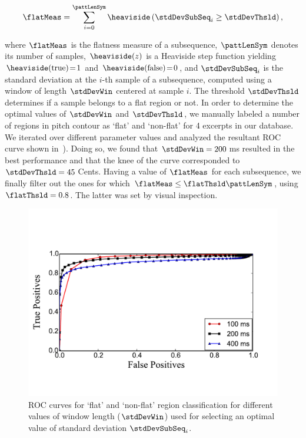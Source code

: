 \begin{equation}
\label{eq:flatness_measure}
\flatMeas =\sum_{i=0}^{\pattLenSym} \heaviside\left(\stdDevSubSeq_i\geq \stdDevThsld\right),
\end{equation}


\noindent where $\flatMeas$ is the flatness measure of a subsequence, $\pattLenSym$ denotes its number of samples, $\heaviside(z)$ is a Heaviside step function yielding $\heaviside(\text{true})\!=\!1$ and $\heaviside(\text{false})\!=\!0$, and $\stdDevSubSeq_i$ is the standard deviation at the $i$-th sample of a subsequence, computed using a window of length $\stdDevWin$ centered at sample $i$. The threshold $\stdDevThsld$ determines if a sample belongs to a flat region or not. In order to determine the optimal values of $\stdDevWin$ and $\stdDevThsld$, we manually labeled a number of regions in pitch contour as `flat' and `non-flat' for 4 excerpts in our database. We iterated over different parameter values and analyzed the resultant ROC curve shown in~). %
Doing so, we found that $\stdDevWin=200$\,ms resulted in the best performance and that the knee of the curve corresponded to $\stdDevThsld=45$\,Cents. Having a value of $\flatMeas$ for each subsequence, we finally filter out the ones for which $\flatMeas \leq \flatThsld \pattLenSym$, using $\flatThsld = 0.8$. The latter was set by visual inspection.

\begin{figure}
	\begin{center}
		\includegraphics[width=\figSizeEightyFive]{ch06_patterns/figures/discovery/ROCFlatness.pdf}
	\end{center}
	\caption{ROC curves for `flat' and `non-flat' region classification for different values of window length ($\stdDevWin$) used for selecting an optimal value of standard deviation $\stdDevSubSeq_i$.}
	\label{fig:ROC_pattern_discovery}
\end{figure}

